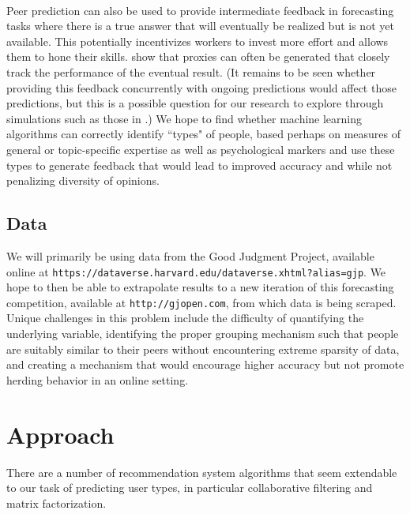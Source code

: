 \documentclass[a4paper, 11pt]{article}
\begin{document}
\paragraph{} Peer prediction can also be used to provide intermediate feedback in forecasting tasks where there is a true answer that will eventually be realized but is not yet available. This potentially incentivizes workers to invest more effort and allows them to hone their skills. \citet{witkowski2017proper} show that proxies can often be generated that closely track the performance of the eventual result. (It remains to be seen whether providing this feedback concurrently with ongoing predictions would affect those predictions, but this is a possible question for our research to explore through simulations such as those in \citet{shnayder2016measuring}.) We hope to find whether machine learning algorithms can correctly identify ``types" of people, based perhaps on measures of general or topic-specific expertise as well as psychological markers and use these types to generate feedback that would lead to improved accuracy and while not penalizing diversity of opinions. 
\subsection{Data}
We will primarily be using data from the Good Judgment Project, available online at  \texttt{https://dataverse.harvard.edu/dataverse.xhtml?alias=gjp}. We hope to then be able to extrapolate results to a new iteration of this forecasting competition, available at \texttt{http://gjopen.com}, from which data is being scraped. Unique challenges in this problem include the difficulty of quantifying the underlying variable, identifying the proper grouping mechanism such that people are suitably similar to their peers without encountering extreme sparsity of data, and creating a mechanism that would encourage higher accuracy but not promote herding behavior in an online setting.

\section{Approach}
There are a number of recommendation system algorithms that seem extendable to our task of predicting user types, in particular collaborative filtering and matrix factorization.
\end{document}
